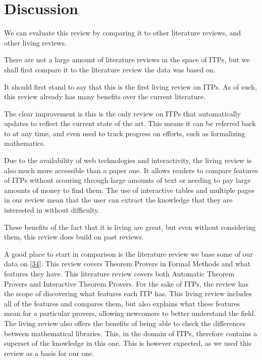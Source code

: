 \documentclass[
]{article}
\begin{document}
\hypertarget{discussion}{%
\section{Discussion}\label{discussion}}

We can evaluate this review by comparing it to other literature reviews,
and other living reviews.

There are not a large amount of literature reviews in the space of ITPs,
but we shall first compare it to the literature review the data was
based on.

It should first stand to say that this is the first living review on
ITPs. As of such, this review already has many benefits over the current
literature.

The clear improvement is this is the only review on ITPs that
automatically updates to reflect the current state of the art. This
means it can be referred back to at any time, and even used to track
progress on efforts, such as formalizing mathematics.

Due to the availability of web technologies and interactivity, the
living review is also much more accessible than a paper one. It allows
readers to compare features of ITPs without scouring through large
amounts of text or needing to pay large amounts of money to find them.
The use of interactive tables and multiple pages in our review mean that
the user can extract the knowledge that they are interested in without
difficulty.

These benefits of the fact that it is living are great, but even without
considering them, this review does build on past reviews.

A good place to start in comparison is the literature review we base
some of our data on {[}\protect\hyperlink{ref-nawaz_survey_2019}{34}{]}.
This review covers Theorem Provers in Formal Methods and what features
they have. This literature review covers both Automatic Theorem Provers
and Interactive Theorem Provers. For the sake of ITPs, the review has
the scope of discovering what features each ITP has. This living review
includes all of the features and compares them, but also explains what
these features mean for a particular provers, allowing newcomers to
better understand the field. The living review also offers the benefits
of being able to check the differences between mathematical libraries.
This, in the domain of ITPs, therefore contains a superset of the
knowledge in this one. This is however expected, as we used this review
as a basis for our one.
\end{document}
